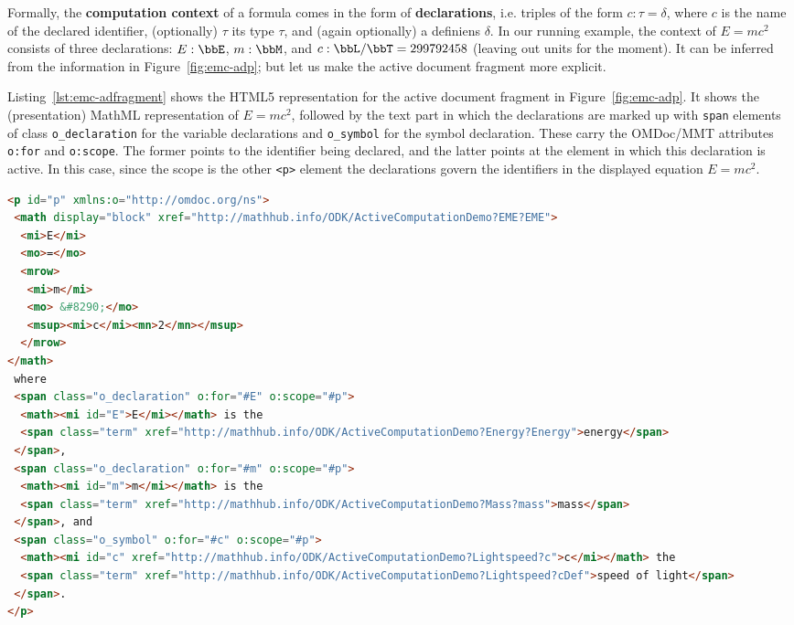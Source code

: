 Formally, the \textbf{computation context} of a formula comes in the form of
\textbf{declarations}, i.e. triples of the form $c:\tau=\delta$, where $c$ is the name of
the declared identifier, (optionally) $\tau$ its type $\tau$, and (again optionally) a
definiens $\delta$. In our running example, the context of $E=mc^2$ consists of three
declarations: $E:\bbE$, $m:\bbM$, and $c:\bbL/\bbT=299 792 458$ (leaving out units for the
moment). It can be inferred from the information in Figure~\ref{fig:emc-adp}; but let us
make the active document fragment more explicit.

Listing~\ref{lst:emc-adfragment} shows the HTML5 representation for the active
document fragment in Figure~\ref{fig:emc-adp}. It shows the (presentation) MathML
representation of $E=mc^2$, followed by the text part in which the declarations are marked
up with \lstinline|span| elements of class \lstinline|o_declaration| for the variable
declarations and \lstinline|o_symbol| for the symbol declaration. These carry the
OMDoc/MMT attributes \lstinline|o:for| and \lstinline|o:scope|. The former points to the
identifier being declared, and the latter points at the element in which this declaration
is active. In this case, since the scope is the other \lstinline|<p>| element the
declarations govern the identifiers in the displayed equation $E=mc^2$.

\begin{lstlisting}[label=lst:emc-adfragment,caption=Native Markup for an Active Document Fragment,
language=HTML,basicstyle=\footnotesize\sf,mathescape,morekeywords={mi,mo,msup,math,mrow}]
<p id="p" xmlns:o="http://omdoc.org/ns">
 <math display="block" xref="http://mathhub.info/ODK/ActiveComputationDemo?EME?EME">
  <mi>E</mi>
  <mo>=</mo>
  <mrow>
   <mi>m</mi>
   <mo> &#8290;</mo>
   <msup><mi>c</mi><mn>2</mn></msup>
  </mrow>
</math>
 where
 <span class="o_declaration" o:for="#E" o:scope="#p">
  <math><mi id="E">E</mi></math> is the
  <span class="term" xref="http://mathhub.info/ODK/ActiveComputationDemo?Energy?Energy">energy</span>
 </span>,
 <span class="o_declaration" o:for="#m" o:scope="#p">
  <math><mi id="m">m</mi></math> is the
  <span class="term" xref="http://mathhub.info/ODK/ActiveComputationDemo?Mass?mass">mass</span>
 </span>, and
 <span class="o_symbol" o:for="#c" o:scope="#p">
  <math><mi id="c" xref="http://mathhub.info/ODK/ActiveComputationDemo?Lightspeed?c">c</mi></math> the
  <span class="term" xref="http://mathhub.info/ODK/ActiveComputationDemo?Lightspeed?cDef">speed of light</span>
 </span>.
</p>
\end{lstlisting}

